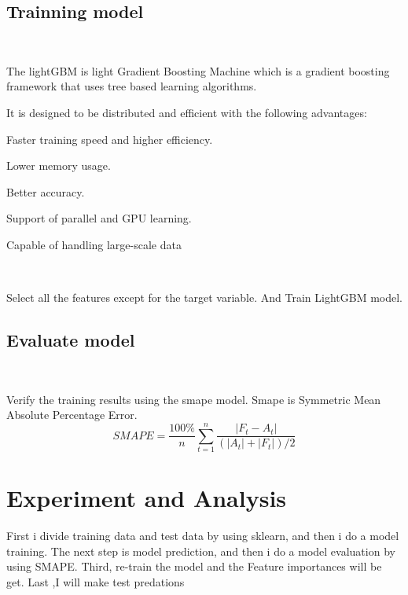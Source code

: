 \subsection{Trainning model}
\ 

The lightGBM is light Gradient Boosting Machine which is a gradient boosting framework that uses tree based learning algorithms. 
\ 

It is designed to be distributed and efficient with the following advantages:
\ 

\begin{description}
  \item  Faster training speed and higher efficiency.
  \item  Lower memory usage.
  \item  Better accuracy.
  \item  Support of parallel and GPU learning.
  \item  Capable of handling large-scale data
\end{description}
\ 

Select all the features except for the target variable. And Train LightGBM model.
\subsection{ Evaluate model}
\

Verify the training results using the smape model. Smape is Symmetric Mean Absolute Percentage Error.
\ 
\[SMAPE=\frac{100\%}{n}\sum_{t=1}^n\frac{|F_t-A_t|}{(|A_t|+|F_t|)/2} \]







\section{Experiment and Analysis}

First i divide training data and test data by using sklearn, and 
then i do a model training. The next step is model prediction, and 
then i do a model evaluation by using SMAPE. Third, re-train the 
model and the Feature importances will be get. Last ,I will make test predations

